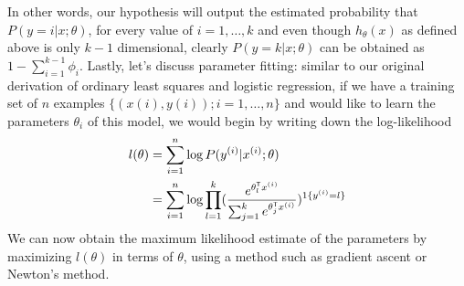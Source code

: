 In other words, our hypothesis will output the estimated probability that $P(y = i | x; \theta)$, for every value
of $i= 1, \dots, k$ and even though $h_{\theta}(x)$ as defined above is only $k-1$ dimensional, clearly 
$P(y = k | x; \theta)$ can be obtained as $1 - \sum _{i=1}^{k-1} \phi_i$.\newline
Lastly, let’s discuss parameter fitting: similar to our original derivation of ordinary least squares
and logistic regression, if we have a training set of $n$ examples $\{(x(i), y(i)); i= 1, \dots, n\}$ 
and would like to learn the parameters $\theta_i$ of this model, we would begin by writing down the log-likelihood
\begin{align*}
    l(\theta) & = \sum _{i=1} ^ n \log P(y^{(i)} | x^{(i)}; \theta) \\
              & = \sum _{i=1} ^ n \log \prod _{l=1}^k (\frac{e^{\theta_l ^ \mathsf{T}x^{(i)}}}
                  {\sum _{j=1}^k e^{\theta_j ^ \mathsf{T}x^{(i)}}})^{1\{y^{(i)} = l\}} \\
\end{align*}
We can now obtain the maximum likelihood estimate of the parameters by maximizing $l(\theta)$ in terms of $\theta$,
using a method such as gradient ascent or Newton’s method.
